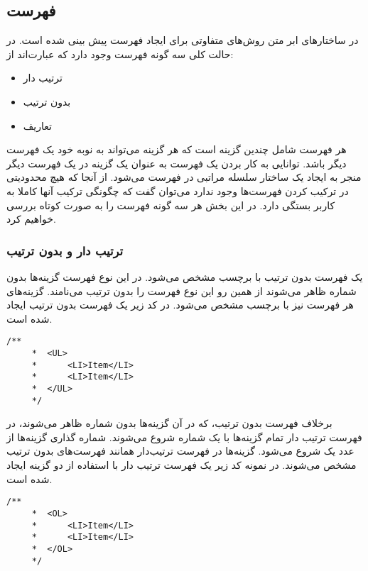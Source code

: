 \subsection{فهرست}
در ساختارهای ابر متن روش‌های متفاوتی برای ایجاد فهرست پیش بینی شده است. در حالت کلی سه
گونه فهرست وجود دارد که عبارت‌اند از:
\begin{itemize}
 \item ترتیب دار
 \item بدون ترتیب
 \item تعاریف
\end{itemize}
هر فهرست شامل چندین گزینه است که هر گزینه می‌تواند به نوبه خود یک فهرست دیگر باشد. توانایی
به کار بردن یک فهرست به عنوان یک گزینه در یک فهرست دیگر منجر به ایجاد یک ساختار سلسله مراتبی
در فهرست می‌شود. از آنجا که هیچ محدودیتی در ترکیب کردن فهرست‌ها وجود ندارد می‌توان گفت که 
چگونگی ترکیب آنها کاملا به کاربر بستگی دارد. در این بخش هر سه گونه فهرست را به صورت کوتاه بررسی
خواهیم کرد.
\subsubsection{ ترتیب دار و بدون ترتیب}
یک فهرست بدون ترتیب با برچسب  مشخص می‌شود. در این نوع فهرست گزینه‌ها بدون شماره ظاهر
می‌شوند  از همین رو این نوع فهرست را بدون ترتیب می‌نامند. گزینه‌های هر فهرست نیز با برچسب  مشخص
می‌شود. در کد زیر یک فهرست بدون ترتیب ایجاد شده است.
\begin{latin}
\lstset{language=C++}  
\begin{lstlisting}[frame=single] 
    /**
     *	<UL>
     * 		<LI>Item</LI>
     * 		<LI>Item</LI>
     * 	</UL>
     */
\end{lstlisting}
\end{latin}
برخلاف فهرست بدون ترتیب، که در آن گزینه‌ها بدون شماره ظاهر می‌شوند، در فهرست ترتیب دار تمام گزینه‌ها با 
یک شماره شروع می‌شوند. شماره گذاری گزینه‌ها از عدد یک شروع می‌شود. گزینه‌ها در فهرست ترتیب‌دار همانند
فهرست‌های بدون ترتیب مشخص می‌شوند. در نمونه کد زیر یک فهرست ترتیب دار با استفاده از دو گزینه ایجاد
شده است.
\begin{latin}
\lstset{language=C++}  
\begin{lstlisting}[frame=single] 
    /**
     *	<OL>
     * 		<LI>Item</LI>
     * 		<LI>Item</LI>
     * 	</OL>
     */
\end{lstlisting}
\end{latin}

